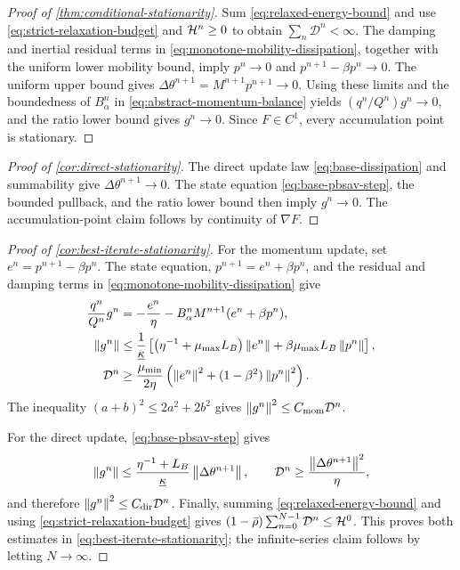 \begin{proof}[Proof of \cref{thm:conditional-stationarity}]
Sum \cref{eq:relaxed-energy-bound} and use
\cref{eq:strict-relaxation-budget} and \(\mathcal{H}^n\geq0\) to obtain
\(\sum_n\mathcal D^n<\infty\).  The damping and inertial residual terms in
\cref{eq:monotone-mobility-dissipation}, together with the uniform lower
mobility bound, imply
\(
p^n\to0
\)
and
\(
p^{n+1}-\beta p^n\to0
\).
The uniform upper bound gives
\(
\Delta\theta^{n+1}=M^{n+1}p^{n+1}\to0
\).
Using these limits and the boundedness of \(B_\alpha^n\) in
\cref{eq:abstract-momentum-balance} yields
\(
(q^n/Q^n)g^n\to0
\), and the ratio lower bound gives \(g^n\to0\). Since \(F\in C^1\), every
accumulation point is stationary.
\end{proof}

\begin{proof}[Proof of \cref{cor:direct-stationarity}]
The direct update law \cref{eq:base-dissipation} and summability give
\(\Delta\theta^{n+1}\to0\).  The state
equation \cref{eq:base-pbsav-step}, the bounded pullback, and the ratio lower
bound then imply \(g^n\to0\).  The accumulation-point claim follows by
continuity of \(\nabla F\).
\end{proof}

\begin{proof}[Proof of \cref{cor:best-iterate-stationarity}]
For the momentum update, set \(e^n=p^{n+1}-\beta p^n\).  The state
equation, \(p^{n+1}=e^n+\beta p^n\), and the residual and damping terms in
\cref{eq:monotone-mobility-dissipation} give
\begin{align}
  \frac{q^n}{Q^n}g^n
  &=-\frac{e^n}{\eta}
  -B_\alpha^nM^{n+1}(e^n+\beta p^n),\nonumber\\
  \left\lVert g^n\right\rVert
  &\leq\frac1{\underline\kappa}
  \left[
    \left(\eta^{-1}+\mu_{\max}L_B\right)\left\lVert e^n\right\rVert
    +\beta\mu_{\max}L_B\left\lVert p^n\right\rVert
  \right],\nonumber\\
  \mathcal D^n
  &\geq\frac{\mu_{\min}}{2\eta}
  \left(\left\lVert e^n\right\rVert^2+(1-\beta^2)\left\lVert p^n\right\rVert^2\right).
  \label{eq:gradient-dissipation-bounds}
\end{align}
The inequality \((a+b)^2\leq2a^2+2b^2\) gives
\(
\left\lVert g^n\right\rVert^2\leq C_{\mathrm{mom}}\mathcal D^n
\).

For the direct update, \cref{eq:base-pbsav-step} gives
\begin{equation}
  \left\lVert g^n\right\rVert
  \leq\frac{\eta^{-1}+L_B}{\underline\kappa}
  \left\lVert\Delta\theta^{n+1}\right\rVert,
  \qquad
  \mathcal D^n\geq
  \frac{\left\lVert\Delta\theta^{n+1}\right\rVert^2}{\eta},
\end{equation}
and therefore
\(
\left\lVert g^n\right\rVert^2\leq C_{\mathrm{dir}}\mathcal D^n
\).
Finally, summing \cref{eq:relaxed-energy-bound} and using
\cref{eq:strict-relaxation-budget} gives
\(
(1-\bar\rho)\sum_{n=0}^{N-1}\mathcal D^n\leq\mathcal{H}^0
\).
This proves both estimates in \cref{eq:best-iterate-stationarity}; the
infinite-series claim follows by letting \(N\to\infty\).
\end{proof}
